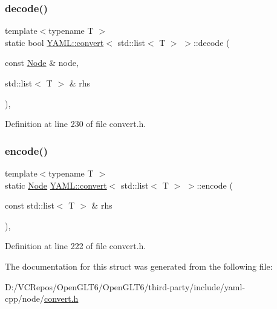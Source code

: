 \subsubsection{\texorpdfstring{decode()}{decode()}}
{\footnotesize\ttfamily template$<$typename T $>$ \\
static bool \mbox{\hyperlink{struct_y_a_m_l_1_1convert}{Y\+A\+M\+L\+::convert}}$<$ std\+::list$<$ T $>$ $>$\+::decode (\begin{DoxyParamCaption}\item[{const \mbox{\hyperlink{class_y_a_m_l_1_1_node}{Node}} \&}]{node,  }\item[{std\+::list$<$ T $>$ \&}]{rhs }\end{DoxyParamCaption})\hspace{0.3cm}{\ttfamily [inline]}, {\ttfamily [static]}}



Definition at line 230 of file convert.\+h.

\mbox{\label{struct_y_a_m_l_1_1convert_3_01std_1_1list_3_01_t_01_4_01_4_ad1860762a3b4c19b04cacca6061ae79e}} 
\subsubsection{\texorpdfstring{encode()}{encode()}}
{\footnotesize\ttfamily template$<$typename T $>$ \\
static \mbox{\hyperlink{class_y_a_m_l_1_1_node}{Node}} \mbox{\hyperlink{struct_y_a_m_l_1_1convert}{Y\+A\+M\+L\+::convert}}$<$ std\+::list$<$ T $>$ $>$\+::encode (\begin{DoxyParamCaption}\item[{const std\+::list$<$ T $>$ \&}]{rhs }\end{DoxyParamCaption})\hspace{0.3cm}{\ttfamily [inline]}, {\ttfamily [static]}}



Definition at line 222 of file convert.\+h.



The documentation for this struct was generated from the following file\+:\begin{DoxyCompactItemize}
\item 
D\+:/\+V\+C\+Repos/\+Open\+G\+L\+T6/\+Open\+G\+L\+T6/third-\/party/include/yaml-\/cpp/node/\mbox{\hyperlink{convert_8h}{convert.\+h}}\end{DoxyCompactItemize}
